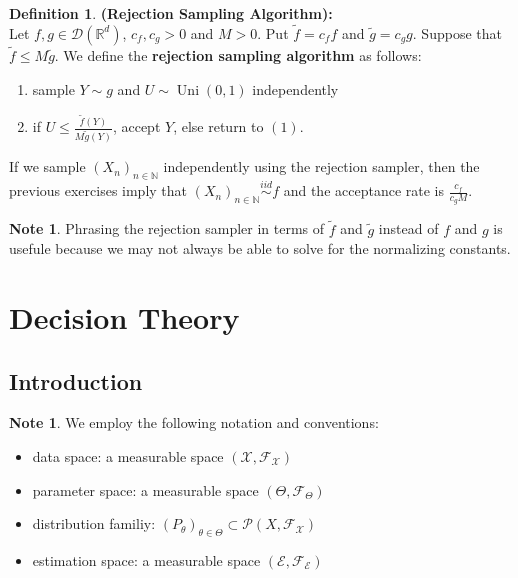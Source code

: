 \documentclass[12pt]{amsart}
\theoremstyle{definition}
\newtheorem{defn}[definition]{Definition}
\newtheorem{note}[definition]{Note}
\newcommand{\N}{\mathbb{N}}
\newcommand{\R}{\mathbb{R}}
\newcommand{\MD}{\mathcal{D}}
\newcommand{\MF}{\mathcal{F}}
\newcommand{\MP}{\mathcal{P}}
\newcommand{\ME}{\mathcal{E}}
\newcommand{\MX}{\mathcal{X}}
\newcommand{\iid}{\stackrel{iid}{\sim}}
\DeclareMathOperator{\uni}{Uni}
\begin{document}
	\begin{defn}\textbf{(Rejection Sampling Algorithm):} \\
		Let $f, g \in \MD(\R^d)$, $c_f,c_g>0$ and $M > 0$. Put $\tilde{f} = c_f f$ and $\tilde{g} = c_g g$. Suppose that $\tilde{f} \leq M \tilde{g}$. We define the \textbf{rejection sampling algorithm} as follows:
		\begin{enumerate}
			\item sample $Y \sim g$ and $U \sim \uni(0,1)$ independently
			\item if $U \leq \frac{\tilde{f}(Y)}{M\tilde{g}(Y)} $, accept $Y$, else return to $(1)$.
		\end{enumerate}
		If we sample $(X_n)_{n \in \N}$ independently using the rejection sampler, then the previous exercises imply that $(X_n)_{n \in \N} \iid f$ and the acceptance rate is $\frac{c_f}{c_gM}$.
	\end{defn}

	\begin{note}
		Phrasing the rejection sampler in terms of $\tilde{f}$ and $\tilde{g}$ instead of $f$ and $g$ is usefule because we may not always be able to solve for the normalizing constants.
	\end{note}
	
	
	
	
	
	
	
	
	
	
	
	
	
	
	
	
	
	
	
	
	
	
	
	
		\newpage
	\section{Decision Theory}
	
	\subsection{Introduction}
	
	\begin{note} We employ the following notation and conventions:
		\begin{itemize}
			\item data space: a measurable space $(\MX, \MF_{\MX})$
			\item parameter space: a measurable space $(\Theta, \MF_{\Theta})$
			\item distribution familiy: $(P_{\theta})_{\theta \in \Theta} \subset \MP(X, \MF_{\MX})$
			\item estimation space: a measurable space $(\ME, \MF_{\ME})$
		\end{itemize}
	\end{note}
\end{document}
